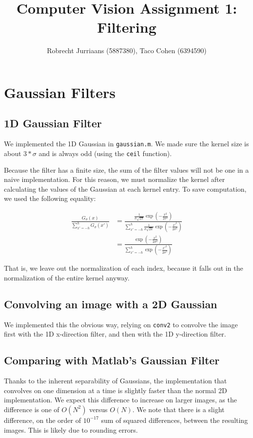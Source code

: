 \documentclass[a4paper,10pt]{article}
\title{Computer Vision Assignment 1: Filtering}
\author{Robrecht Jurriaans (5887380), Taco Cohen (6394590)}
\begin{document}
\maketitle


\section{Gaussian Filters}

\subsection{1D Gaussian Filter}
We implemented the 1D Gaussian in \verb+gaussian.m+.
We made sure the kernel size is about $3*\sigma$ and is always odd (using the \verb+ceil+ function).

Because the filter has a finite size, the sum of the filter values will not be one in a naive implementation.
For this reason, we must normalize the kernel after calculating the values of the Gaussian at each kernel entry.
To save computation, we used the following equality:

\begin{align*}
 \frac{G_{\sigma}(x)}{\sum_{x'=-h}^h G_{\sigma}(x')} &= \frac{ \frac{1}{\sigma \sqrt{2 \pi}} \exp(-\frac{x^2}{2 \sigma^2})}
       {\sum_{x'=-h}^h \frac{1}{\sigma \sqrt{2 \pi}} \exp(-\frac{x'^2}{2 \sigma^2})} \\
&= \frac{ \exp(-\frac{x^2}{2 \sigma^2})}
       {\sum_{x'=-h}^h \exp(-\frac{x'^2}{2 \sigma^2})}
\end{align*}

That is, we leave out the normalization of each index, because it falls out in the normalization of the entire kernel anyway.


\subsection{Convolving an image with a 2D Gaussian}
We implemented this the obvious way, relying on \verb+conv2+ to convolve the image first with the 1D x-direction filter, and then with the 1D y-direction filter.

\subsection{Comparing with Matlab's Gaussian Filter}
Thanks to the inherent separability of Gaussians, the implementation that convolves on one dimension at a time is slightly faster than the normal 2D implementation. We expect this difference to increase on larger images, as the difference is one of $O(N^2)$ versus $O(N)$. We note that there is a slight difference, on the order of $10^{-17}$ sum of squared differences, between the resulting images. This is likely due to rounding errors.
\end{document}

